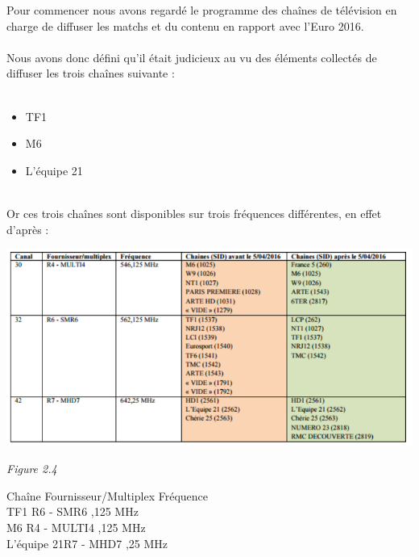 \documentclass{report}
\begin{document}
	
    Pour commencer nous avons regardé le programme des chaînes de télévision en charge de diffuser les matchs et du contenu en rapport avec l’Euro 2016.
    \\
    \\
    Nous avons donc défini qu’il était judicieux au vu des éléments collectés de diffuser les trois chaînes suivante :
    \\
    \\
    \begin{itemize}
    \item TF1
    \item M6
    \item L’équipe 21
    \end{itemize}
    
    \hfill
    
    \\
    Or ces trois chaînes sont disponibles sur trois fréquences différentes, en effet d’après :
    \\
    \begin{center}
    \includegraphics[width=16cm]{img/freq.PNG}
    
    \textit{\small{Figure 2.4}}
    \end{center}
    
    
    \hfill

    Chaîne  \rightarrow Fournisseur/Multiplex \rightarrow Fréquence
    \\
    
    TF1  \rightarrow R6 - SMR6 ,125 MHz
    \\
    
    M6  \rightarrow R4 - MULTI4 ,125 MHz
    \\
    
    L'équipe 21\rightarrow R7 - MHD7 ,25 MHz
    \\
    \\
    
\end{document}

